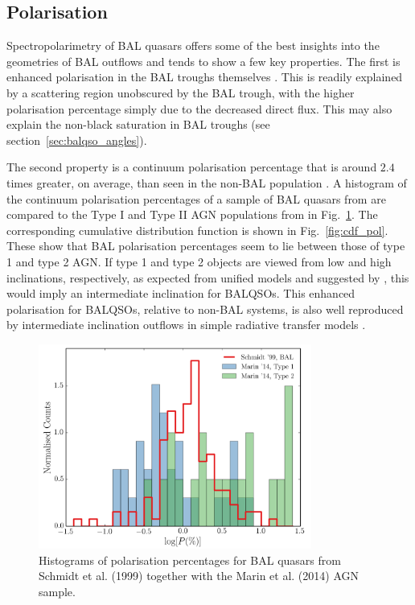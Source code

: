 \subsection{Polarisation}

Spectropolarimetry of BAL quasars offers some of
the best insights into the geometries of BAL outflows and 
tends to show a few key properties. The first is enhanced 
polarisation in the BAL troughs themselves \citep{schmidt1999}. 
This is readily explained by a scattering region unobscured by the
BAL trough, with the higher polarisation percentage simply due to the
decreased direct flux. This may also explain the non-black saturation in
BAL troughs (see section~\ref{sec:balqso_angles}).

The second property 
is a continuum polarisation percentage that is around $2.4$ times greater, 
on average, than seen in the non-BAL population \citep{schmidt1999}.
A histogram of the continuum polarisation percentages of a sample of BAL quasars from 
\cite{schmidt1999} are compared to the Type I and Type II AGN 
populations from \cite{marin2014} in Fig.~\ref{fig:bal_polarisation}.
The corresponding cumulative distribution function is shown in Fig.~\ref{fig:cdf_pol}.
These show that BAL polarisation percentages seem to lie between those of type 1
and type 2 AGN. If type 1 and type 2 objects are viewed from low and high 
inclinations, respectively, as expected from unified models and suggested by
\cite{marin2014,marin2016}, this would imply  an intermediate inclination
for BALQSOs. This enhanced polarisation for BALQSOs, relative to non-BAL systems,
is also well reproduced by intermediate
inclination outflows in simple radiative transfer models \citep{marin2013}.

\begin{figure}
\centering
\includegraphics[width=0.8\textwidth]{figures/ewpaper/hist_p.png}
\caption
{
Histograms of polarisation percentages 
for BAL quasars from Schmidt et al. (1999) together with the 
Marin et al. (2014) AGN sample. 
}
\label{fig:bal_polarisation}
\end{figure}

